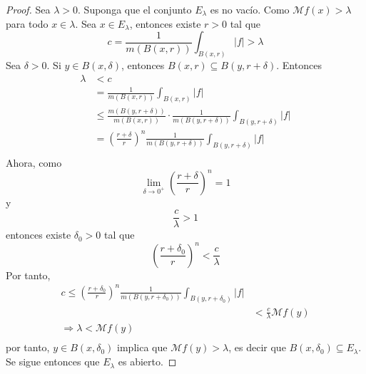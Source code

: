 \documentclass[12pt]{report}
\theoremstyle{largebreak}
\renewcommand{\leq}{\ensuremath{\leqslant}}
\newcommand\abs[1]{\ensuremath{\left|#1\right|}}
\begin{document}
    \begin{proof}
        Sea $\lambda>0$. Suponga que el conjunto $E_\lambda$ es no vacío. Como $\mathcal{M}f(x)>\lambda$ para todo $x\in\lambda$. Sea $x\in E_\lambda$, entonces existe $r>0$ tal que
        \begin{equation*}
            c=\frac{1}{m(B(x,r))}\int_{ B(x,r)}\abs{f}>\lambda
        \end{equation*}
        Sea $\delta>0$. Si $y\in B(x,\delta)$, entonces $B(x,r)\subseteq B(y,r+\delta)$. Entonces
        \begin{equation*}
            \begin{split}
                \lambda&<c\\
                &=\frac{1}{m(B(x,r))}\int_{ B(x,r)}\abs{f}\\
                &\leq\frac{m(B(y,r+\delta))}{m(B(x,r))}\cdot\frac{1}{m(B(y,r+\delta))}\int_{ B(y,r+\delta)}\abs{f}\\
                &=\left(\frac{r+\delta}{r} \right)^n\frac{1}{m(B(y,r+\delta))}\int_{ B(y,r+\delta)}\abs{f}\\
            \end{split}
        \end{equation*}
        Ahora, como
        \begin{equation*}
            \lim_{\delta\rightarrow0^+}\left(\frac{r+\delta}{r}\right)^n=1
        \end{equation*}
        y
        \begin{equation*}
            \frac{c}{\lambda}>1
        \end{equation*}
        entonces existe $\delta_0>0$ tal que
        \begin{equation*}
            \left(\frac{r+\delta_0}{r}\right)^n<\frac{c}{\lambda}
        \end{equation*}
        Por tanto,
        \begin{equation*}
            \begin{split}
                c\leq\left(\frac{r+\delta_0}{r} \right)^n\frac{1}{m(B(y,r+\delta_0))}\int_{ B(y,r+\delta_0)}\abs{f}\\
                &<\frac{c}{\lambda}\mathcal{M}f(y)\\
                \Rightarrow \lambda<\mathcal{M}f(y)\\
            \end{split}
        \end{equation*}
        por tanto, $y\in B(x,\delta_0)$ implica que $\mathcal{M}f(y)>\lambda$, es decir que $B(x,\delta_0)\subseteq E_\lambda$. Se sigue entonces que $E_\lambda$ es abierto.
    \end{proof}
\end{document}
